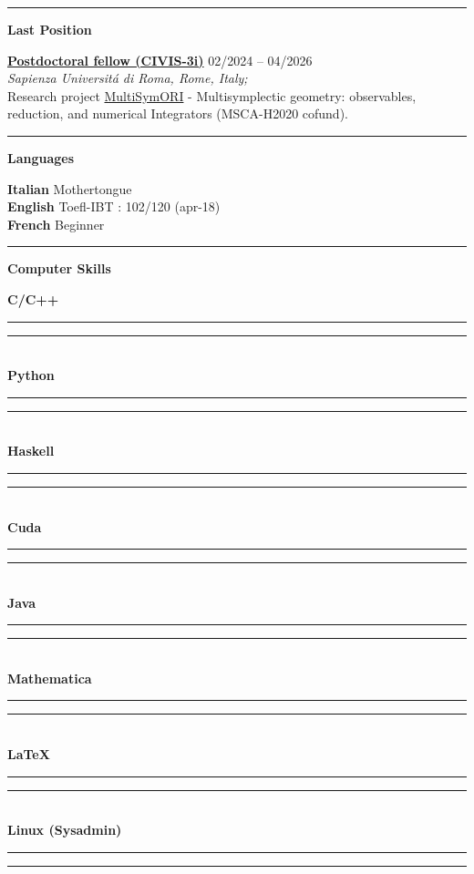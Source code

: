 \documentclass[a4paper]{article}
\newcommand{\crule}[3][black]{\textcolor{#1}{\rule{#2}{#3}}}
\newcommand{\progbar}[4][black]{\crule[#1]{#3}{#4}\crule[#1!10!white!90]{#2}{#4}}
\newcommand{\block}[1]{\hrule \vspace{0.2cm} \textbf{\Large #1} \vspace{0.2cm}}
\newcommand{\voice}[5]{\href{#4}{\textbf{#1}} \hfill #2 \\ \textit{#3} \\ {\small #5} \vspace{0.2cm} \\}
\newcommand{\skill}[2]{\textbf{#1} \hfill #2 \\}
\newcommand{\skillbar}[4]{\textbf{#1} \hfill \progbar{#2}{#3}{#4} \\}
\begin{document}
	\begin{minipage}[t]{0.6\columnwidth}

		\block{Last Position} %

		\voice{Postdoctoral fellow (CIVIS-3i)}
			{02/2024 -- 04/2026}
			{Sapienza Universit\'a di Roma, Rome, Italy;}
			{https://civis3i.univ-amu.fr/en/civis3i-alliance-programme}       
			{Research project \href{https://civis3i.univ-amu.fr/en/antonio-michele-miti}{MultiSymORI} - Multisymplectic geometry: observables, reduction, and numerical Integrators (MSCA-H2020 cofund).
			\vspace{-0.25cm}}


	\end{minipage} 
	\hfill
	\begin{minipage}[t]{0.375\columnwidth}


		\block{Languages} 
		
		\skill{Italian}{Mothertongue}
		\skill{English}{Toefl-IBT : 102/120 (apr-18)}
		\skill{French}{Beginner}


		\block{Computer Skills} 
		
		\skillbar{C/C++}
			{1.4cm}
			{0.6cm}
			{0.25cm}
		\skillbar{Python}
			{1.1cm}
			{0.9cm}
			{0.25cm}
		\skillbar{Haskell}
			{1.5cm}
			{0.5cm}
			{0.25cm}
		\skillbar{Cuda}
			{1.1cm}
			{0.9cm}
			{0.25cm}
		\skillbar{Java}
			{1.2cm}
			{0.8cm}
			{0.25cm}
		\skillbar{Mathematica}
			{1.4cm}
			{0.6cm}
			{0.25cm}
		\skillbar{\LaTeX}
			{0.5cm}
			{1.5cm}
			{0.25cm}
		\skillbar{Linux (Sysadmin)}
			{0.7cm}
			{1.3cm}
			{0.25cm}
	\end{minipage}
\end{document}

